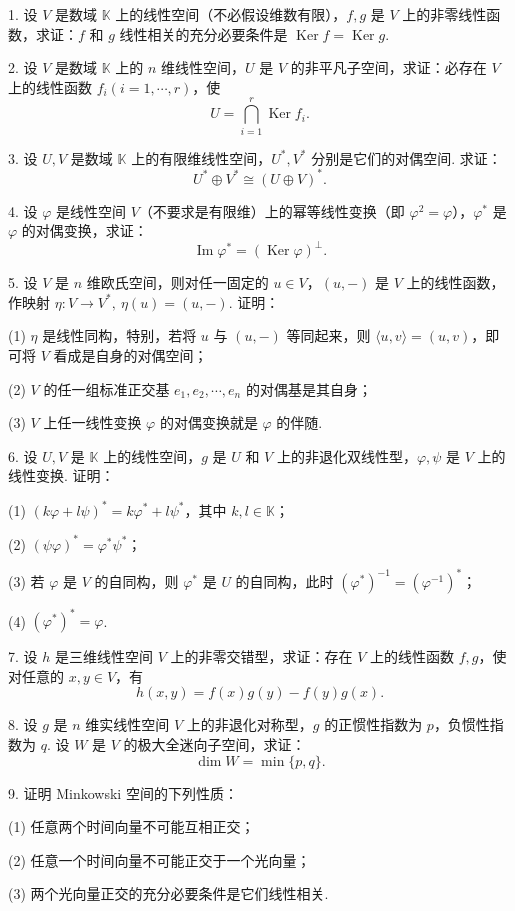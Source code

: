 \documentclass[UTF8,12pt,a4paper,fontset=fandol]{ctexart}
\begin{document}
1. 设 $V$ 是数域 $\mathbb K$ 上的线性空间（不必假设维数有限），$f,g$ 是 $V$ 上的非零线性函数，求证：$f$ 和 $g$ 线性相关的充分必要条件是 $\operatorname{Ker} f=\operatorname{Ker} g$.

2. 设 $V$ 是数域 $\mathbb K$ 上的 $n$ 维线性空间，$U$ 是 $V$ 的非平凡子空间，求证：必存在 $V$ 上的线性函数 $f_i(i=1,\cdots,r)$，使
\[
  U=\bigcap_{i=1}^r \operatorname{Ker} f_i.
\]

3. 设 $U,V$ 是数域 $\mathbb K$ 上的有限维线性空间，$U^*,V^*$ 分别是它们的对偶空间. 求证：
\[
  U^*\oplus V^*\cong (U\oplus V)^*.
\]

4. 设 $\varphi$ 是线性空间 $V$（不要求是有限维）上的幂等线性变换（即 $\varphi^2=\varphi$），$\varphi^*$ 是 $\varphi$ 的对偶变换，求证：
\[
  \operatorname{Im}\varphi^*=(\operatorname{Ker}\varphi)^\perp.
\]

5. 设 $V$ 是 $n$ 维欧氏空间，则对任一固定的 $u\in V$，$(u,-)$ 是 $V$ 上的线性函数，作映射 $\eta:V\to V^*,\ \eta(u)=(u,-)$. 证明：

(1) $\eta$ 是线性同构，特别，若将 $u$ 与 $(u,-)$ 等同起来，则 $\langle u,v\rangle=(u,v)$，即可将 $V$ 看成是自身的对偶空间；

(2) $V$ 的任一组标准正交基 $e_1,e_2,\cdots,e_n$ 的对偶基是其自身；

(3) $V$ 上任一线性变换 $\varphi$ 的对偶变换就是 $\varphi$ 的伴随.

6. 设 $U,V$ 是 $\mathbb K$ 上的线性空间，$g$ 是 $U$ 和 $V$ 上的非退化双线性型，$\varphi,\psi$ 是 $V$ 上的线性变换. 证明：

(1) $(k\varphi+l\psi)^*=k\varphi^*+l\psi^*$，其中 $k,l\in\mathbb K$；

(2) $(\psi\varphi)^*=\varphi^*\psi^*$；

(3) 若 $\varphi$ 是 $V$ 的自同构，则 $\varphi^*$ 是 $U$ 的自同构，此时 $(\varphi^*)^{-1}=(\varphi^{-1})^*$；

(4) $(\varphi^*)^*=\varphi$.

7. 设 $h$ 是三维线性空间 $V$ 上的非零交错型，求证：存在 $V$ 上的线性函数 $f,g$，使对任意的 $x,y\in V$，有
\[
  h(x,y)=f(x)g(y)-f(y)g(x).
\]

8. 设 $g$ 是 $n$ 维实线性空间 $V$ 上的非退化对称型，$g$ 的正惯性指数为 $p$，负惯性指数为 $q$. 设 $W$ 是 $V$ 的极大全迷向子空间，求证：
\[
  \dim W=\min\{p,q\}.
\]

9. 证明 Minkowski 空间的下列性质：

(1) 任意两个时间向量不可能互相正交；

(2) 任意一个时间向量不可能正交于一个光向量；

(3) 两个光向量正交的充分必要条件是它们线性相关.
\end{document}
